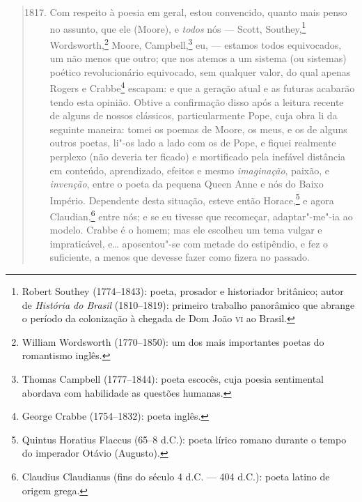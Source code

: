 \begin{quote} %
\begin{enumerate}[label=(\arabic*)]
  \setcounter{enumi}{1816}
\item\mbox{} Com respeito à poesia em geral, estou convencido, quanto mais
penso no assunto, que ele (Moore), e \textit{todos} nós --- Scott,
Southey,\footnote{Robert Southey (1774--1843): poeta, prosador e
  historiador britânico; autor de \textit{História do Brasil}
  (1810--1819): primeiro trabalho panorâmico que abrange o
  período da colonização à chegada de Dom João \textsc{vi} ao Brasil.} Wordsworth,\footnote{William Wordsworth (1770--1850): um dos
  mais importantes poetas do romantismo inglês.} Moore,
Campbell,\footnote{Thomas Campbell (1777--1844): poeta escocês, cuja
  poesia sentimental abordava com habilidade as questões humanas.} eu, --- estamos todos equivocados, um não menos que outro;
que nos atemos a um sistema (ou sistemas) poético revolucionário
equivocado, sem qualquer valor, do qual apenas Rogers e Crabbe\footnote{George
  Crabbe (1754--1832): poeta inglês.} escapam: e que a
geração atual e as futuras acabarão tendo esta opinião. Obtive a
confirmação disso após a leitura recente de alguns de nossos clássicos,
particularmente Pope, cuja obra li da seguinte maneira: tomei os poemas
de Moore, os meus, e os de alguns outros poetas, li"-os lado a lado com
os de Pope, e fiquei realmente perplexo (não deveria ter ficado) e
mortificado pela inefável distância em conteúdo, aprendizado, efeitos e
mesmo \textit{imaginação}, paixão, e \textit{invenção}, entre o poeta da
pequena Queen Anne e nós do Baixo Império. Dependente desta situação,
esteve então Horace,\footnote{Quintus Horatius Flaccus (65--8 d.C.): poeta lírico romano durante o tempo do imperador Otávio
  (Augusto).} e agora Claudian,\footnote{Claudius
  Claudianus (fins do século 4 d.C. --- 404 d.C.): poeta latino de origem
  grega.} entre nós; e se eu tivesse que recomeçar,
adaptar"-me"-ia ao modelo. Crabbe é o homem; mas ele escolheu um tema
vulgar e impraticável, e\ldots{} aposentou"-se com metade do estipêndio, e fez
o suficiente, a menos que devesse fazer como fizera no passado.


\end{enumerate}
\end{quote}
